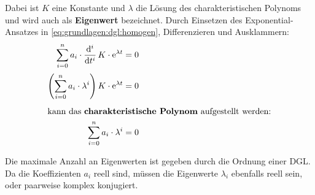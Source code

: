 \begin{frame}
{    %

    Dabei ist $K$ eine Konstante und $\lambda$ die Lösung des charakteristischen Polynoms 
    und wird auch als \textbf{Eigenwert} bezeichnet. 
    Durch Einsetzen des Exponential-Ansatzes in \ref{eq:grundlagen:dgl:homogen}, Differenzieren und Ausklammern:
    \begin{align}
        \sum_{i=0}^{n} a_i \cdot \dt[i]\, K \cdot \mathrm{e}^{\lambda t} &= 0 \nonumber\\[2pt]
        \left(\sum_{i=0}^{n} a_i \cdot \lambda^i \right) K \cdot \mathrm{e}^{\lambda t} &= 0 \nonumber\\[4pt]
    \intertext{kann das \textbf{charakteristische Polynom} aufgestellt werden:}
        \sum_{i=0}^{n} a_i \cdot \lambda^i &= 0
    \end{align}

    Die maximale Anzahl an Eigenwerten ist gegeben durch die Ordnung einer DGL. 
    Da die Koeffizienten $a_i$ reell sind, müssen die Eigenwerte $\lambda_i$ ebenfalls reell sein, oder paarweise komplex konjugiert.

}
\end{frame}
